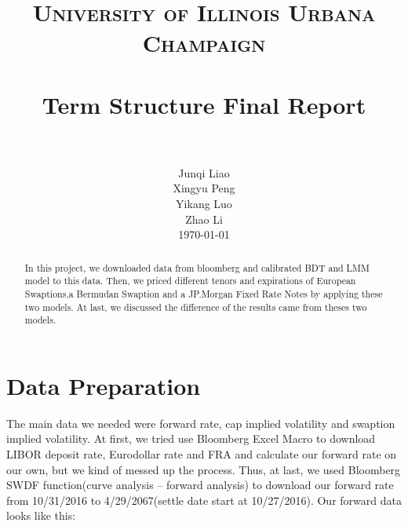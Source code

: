 \documentclass[paper = letterpaper, fontsize=12pt]{article}
\title{
        \usefont{OT1}{bch}{b}{n}
        \normalfont \normalsize \textsc{University of Illinois Urbana Champaign} \\ [25pt]
        \horrule{0.5pt} \\[0.4cm]
        \huge Term Structure Final Report \\
        \horrule{2pt} \\[0.5cm]
}
\author{
        \normalfont                                 \normalsize
        Junqi Liao \\
       \normalfont      \normalsize
        Xingyu Peng \\
       \normalfont      \normalsize
        Yikang Luo\\ 
        \normalfont     \normalsize
        Zhao Li \\
                \normalsize
        \today
}
\date{}
\begin{document}
\maketitle
\begin{abstract}
In this project, we downloaded data from bloomberg and calibrated BDT and LMM model to this data. Then, we priced different tenors and expirations of European Swaptions,a Bermudan Swaption and a JP.Morgan Fixed Rate Notes by applying these two models. At last, we discussed the difference of the results came from theses two models.

\end{abstract}




\section{Data Preparation}
	The main data we needed were forward rate, cap implied volatility and swaption implied volatility. At first, we tried use Bloomberg Excel Macro to download LIBOR deposit rate, Eurodollar rate and FRA and calculate our forward rate on our own, but we kind of messed up the process. Thus, at last, we used Bloomberg SWDF function(curve analysis – forward analysis) to download our forward rate from 10/31/2016 to 4/29/2067(settle date start at 10/27/2016). Our forward data looks like this: 
	
\end{document}
